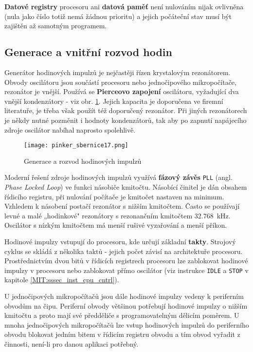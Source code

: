       \textbf{Datové registry} procesoru ani \textbf{datová paměť} není nulováním nijak ovlivněna 
      (nula jako číslo totiž nemá žádnou prioritu) a jejich počáteční stav musí být zajištěn až 
      samotným programem.

    \subsection{Generace a vnitřní rozvod hodin}\label{MIT:chap_clkgen}
      Generátor hodinových impulzů je nejčastěji řízen krystalovým rezonátorem. Obvody oscilátoru 
      jsou součástí procesoru nebo jednočipového mikropočítače, rezonátor je vnější. Používá se 
      \textbf{Pierceovo zapojení} oscilátoru, vyžadující dva vnější kondenzátory - viz obr. 
      \ref{MIT:fig_sbernice17}. Jejich kapacita je doporučena ve firemní literatuře, je třeba však 
      použít též doporučený rezonátor. Při jiných rezonátorech je někdy nutné pozměnit i hodnoty 
      kondenzátorů, tak aby po zapnutí napájecího zdroje oscilátor nabíhal naprosto spolehlivě.
      
      \begin{figure}[ht!] %
        \centering
        \texttt{[image: pinker\_sbernice17.png]}
        \caption{Generace a rozvod hodinových impulzů}
        \label{MIT:fig_sbernice17}
      \end{figure}
      
      Moderní řešení zdroje hodinových impulzů využívá \textbf{fázový závěs} \texttt{PLL} (angl. 
      \emph{Phase Locked Loop}) ve funkci násobiče kmitočtu. Násobící činitel je dán obsahem 
      řídicího registru, při nulování počítače je kmitočet nastaven na minimum. Vzhledem k násobení 
      postačí rezonátor s nižším kmitočtem. Často se používají levné a malé „hodinkové" rezonátory 
      s rezonančním kmitočtem \qty{32.768}{\kilo\hertz}. Oscilátor s nízkým kmitočtem má menší 
      rušivé vyzařování a menší příkon.
      
      Hodinové impulzy vstupují do procesoru, kde určují základní \textbf{takty}. Strojový cyklus 
      se skládá z několika taktů - jejich počet závisí na architektuře procesoru. Prostřednictvím 
      dvou bitů v řídicích registrech procesoru lze zablokovat hodinové impulzy v procesoru nebo 
      zablokovat přímo oscilátor (viz instrukce \texttt{IDLE} a \texttt{STOP} v kapitole 
      \ref{MIT:sssec_inst_cpu_cntrl}). 
      
      U jednočipových mikropočítačů jsou dále hodinové impulzy vedeny k periferním obvodům na čipu. 
      Periferní obvody většinou potřebují hodinové impulzy o nižším kmitočtu a proto mají své 
      předděliče s programovatelným dělicím poměrem. U mnoha jednočipových mikropočítačů lze vstup 
      hodinových impulzů do periferního obvodu blokovat jedním bitem v řídicím registru obvodu a 
      tím obvod vyřadit z činnosti, není-li pro danou aplikaci potřebný.
      
